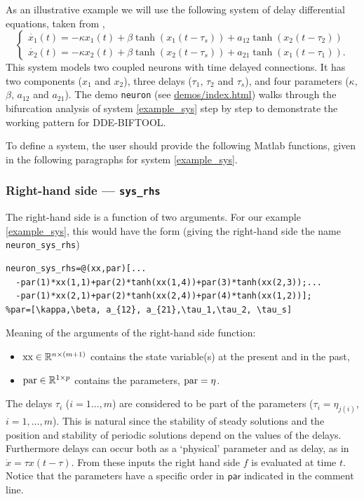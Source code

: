 \documentclass[10pt]{scrartcl}
\newcommand{\DDEBIFCODE}{\textsc{DDE-BIFTOOL}}
\newcommand{\parm}[1]{\mathsf{#1}}
\newcommand{\demobase}{\url{demos/index.html}}
\newcommand{\RR}{\mathbb{R}}
\newcommand{\blist}[1]{\mbox{\lstinline!#1!}}
\begin{document}
As an illustrative example we will use the following system of delay 
differential
equations, taken from \cite{Shay99},
\begin{equation}\label{example_sys}
\left\{
\begin{array}{l}
\dot{x_1}(t)=-\kappa x_1(t)+\beta \tanh(x_1(t-\tau_s))+a_{12}\tanh(x_2(t-\tau_2)) \\
\dot{x_2}(t)=-\kappa x_2(t)+\beta \tanh(x_2(t-\tau_s))+a_{21}\tanh(x_1(t-\tau_1)) .
\end{array}
\right.
\end{equation}
This system models two coupled neurons with time delayed connections.
It has two components ($x_1$ and $x_2$), three delays ($\tau_1$,
$\tau_2$ and $\tau_s$), and four parameters ($\kappa$, $\beta$,
$a_{12}$ and $a_{21}$).  The demo \texttt{neuron} (see
\demobase{}) walks through the
bifurcation analysis of system \eqref{example_sys} step by step to
demonstrate the working pattern for \DDEBIFCODE.

To define a system, the user should provide the following Matlab
functions, given in the following paragraphs for system \eqref{example_sys}.

\subsubsection{Right-hand side --- \blist{sys_rhs}}\label{sec:constrhs} 
The right-hand side is a function of two arguments. For our example
\eqref{example_sys}, this would have the form (giving the right-hand
side the name \blist{neuron_sys_rhs})
\begin{lstlisting}[frame=lines,label=neuron_sys_rhs,caption={Definition for right-hand side of \eqref{example_sys} as a variable.}]
neuron_sys_rhs=@(xx,par)[...
  -par(1)*xx(1,1)+par(2)*tanh(xx(1,4))+par(3)*tanh(xx(2,3));...
  -par(1)*xx(2,1)+par(2)*tanh(xx(2,4))+par(4)*tanh(xx(1,2))];  
%par=[\kappa,\beta, a_{12}, a_{21},\tau_1,\tau_2, \tau_s]
\end{lstlisting}
Meaning of the arguments of the right-hand side function:
\begin{itemize}
\item $\blist{xx}\in\RR^{n\times (m+1)}$ contains the state
variable(s) at the present and in the past,
\item $\blist{par}\in\RR^{1\times
  p}$ contains the parameters, $\blist{par}=\eta$.
\end{itemize}
The delays $\tau_i$ ($i=1\ldots,m$) are considered to be part of the
parameters ($\tau_i=\eta_{j(i)}$, $i=1,\ldots,m$).  This is natural
since the stability of steady solutions and the position and stability
of periodic solutions depend on the values of the delays.  Furthermore
delays can occur both as a `physical' parameter and as delay, as in
$\dot{x}=\tau x(t-\tau)$.  From these inputs the right hand side $f$
is evaluated at time $t$. Notice that the parameters have a specific
order in $\parm{par}$ indicated in the comment line.
\end{document}
